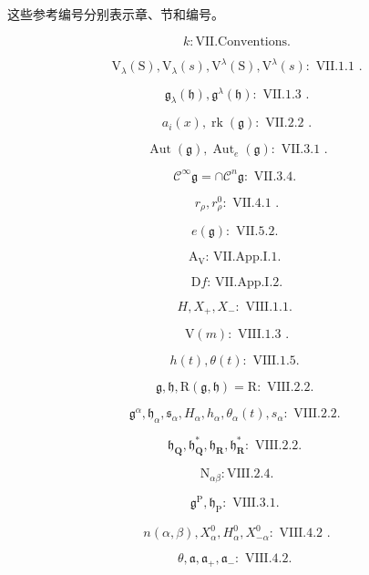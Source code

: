 
这些参考编号分别表示章、节和编号。

\[
k \colon \mathrm{VII.Conventions}.
\]

\[
\mathrm{V} _ {\lambda} (\mathrm{S}), \mathrm{V} _ {\lambda} (s), \mathrm{V} ^ {\lambda} (\mathrm{S}), \mathrm{V} ^ {\lambda} (s) \colon \text { VII.1.1 }.
\]

\[
\mathfrak {g} _ {\lambda} (\mathfrak {h}), \mathfrak {g} ^ {\lambda} (\mathfrak {h}) \colon \text { VII.1.3 }.
\]

\[
a _ {i} (x), \operatorname{rk} (\mathfrak {g}): \text { VII.2.2 }.
\]

\[
\operatorname{Aut} (\mathfrak {g}), \operatorname{Aut} _ {e} (\mathfrak {g}): \text { VII.3.1 }.
\]

\[
\mathscr {C} ^ {\infty} \mathfrak {g} = \cap \mathscr {C} ^ {n} \mathfrak {g}: \text { VII.3.4. }
\]

\[
r _ {\rho}, r _ {\rho} ^ {0}: \text { VII.4.1 }.
\]

\[
e (\mathfrak {g}): \text {   VII.5.2.   }
\]

\[
\mathrm{A} _ {\mathrm{V}} \text {: VII.App.I.1. }
\]

\[
\mathrm{D} f \text {: VII.App.I.2.}
\]

\[
H, X _ {+}, X _ {-}: \text {   VIII.1.1.   }
\]

\[
\mathrm{V} (m): \text { VIII.1.3 }.
\]

\[
h (t), \theta (t): \text {   VIII.1.5.   }
\]

\[
\mathfrak {g}, \mathfrak {h}, \mathrm{R} (\mathfrak {g}, \mathfrak {h}) = \mathrm{R}: \text {   VIII.2.2.   }
\]

\[
\mathfrak {g} ^ {\alpha}, \mathfrak {h} _ {\alpha}, \mathfrak {s} _ {\alpha}, H _ {\alpha}, h _ {\alpha}, \theta_ {\alpha} (t), s _ {\alpha}: \text {   VIII.2.2.   }
\]

\[
\mathfrak {h} _ {\mathbf {Q}}, \mathfrak {h} _ {\mathbf {Q}} ^ {*}, \mathfrak {h} _ {\mathbf {R}}, \mathfrak {h} _ {\mathbf {R}} ^ {*}: \text {   VIII.2.2.   }
\]

\[
\mathrm{N} _ {\alpha \beta}: \mathrm{VIII.2.4}.
\]

\[
\mathfrak {g} ^ {\mathrm{P}}, \mathfrak {h} _ {\mathrm{P}}: \text {   VIII.3.1.   }
\]

\[
n (\alpha , \beta), X _ {\alpha} ^ {0}, H _ {\alpha} ^ {0}, X _ {- \alpha} ^ {0}: \text { VIII.4.2 }.
\]

\[
\theta , \mathfrak {a}, \mathfrak {a} _ {+}, \mathfrak {a} _ {-}: \text {   VIII.4.2.   }
\]


